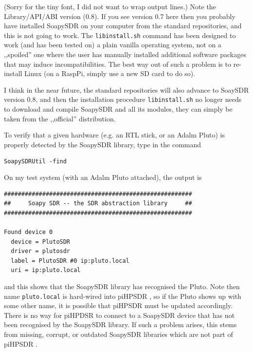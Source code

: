 \documentclass[12pt]{book}
\def\grtt#1{\texttt{\color{magenta}#1}}
\def\pH{pi\-HPSDR }
\begin{document}
(Sorry for the tiny font, I did not want to wrap output lines.)
Note the Library/API/ABI version (0.8). If you see version 0.7 here
then you probably have installed SoapySDR on your computer
from
the standard repositories, and this is not going to work. The \texttt{libinstall.sh} command  has been
designed
to work (and has been tested on) a plain vanilla operating system, not on a ,,spoiled'' one
where the user has manually installed additional software packages that may induce incompatibilities.
The best way out of such a problem is to re-install Linux (on a RaspPi, simply use a new SD card to do so).

I think in the near future, the standard repositories will also advance to SoaySDR version 0.8, and then
the installation procedure \texttt{libinstall.sh} no longer needs to download and compile SoapySDR and all
its modules, they can simply be taken from the ,,official'' distribution.

\clearpage
To verify that a given hardware (e.g. an RTL stick, or an Adalm Pluto) is properly detected by the
SoapySDR library, type in the command

\grtt{SoapySDRUtil -find}

On my test system (with an Adalm Pluto attached), the output is

\begin{small}
\begin{verbatim}
######################################################
##     Soapy SDR -- the SDR abstraction library     ##
######################################################

Found device 0
  device = PlutoSDR
  driver = plutosdr
  label = PlutoSDR #0 ip:pluto.local
  uri = ip:pluto.local
\end{verbatim}
\end{small}

and this shows that the SoapySDR library has recognised the Pluto. Note then name \texttt{pluto.local}
is hard-wired into \pH, so if the Pluto shows up with some other name, it is possible that
\pH must be updated accordingly. There is no way for piHPDSR to connect
to a SoapySDR device that has not been recognised by the SoapySDR library. If such a problem arises, this
stems from missing, corrupt, or outdated SoapySDR libraries which are not part of \pH.

\end{document}
